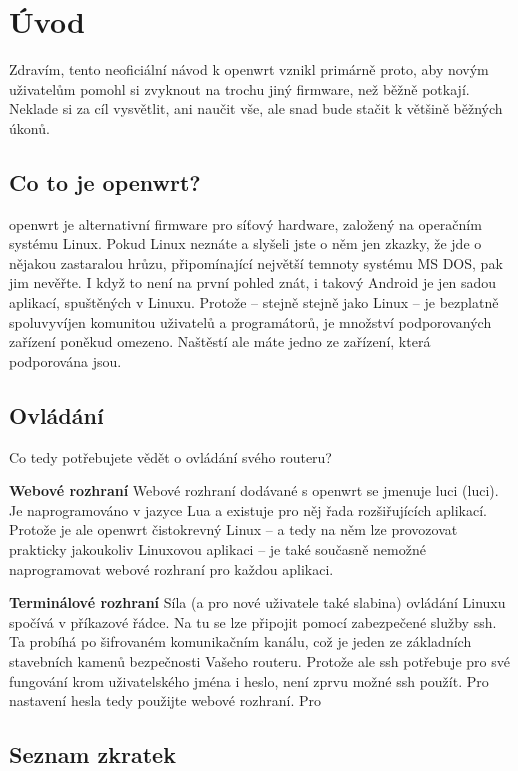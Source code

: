 \section{Úvod}
Zdravím, tento neoficiální návod k \gls{openwrt} vznikl primárně proto,
aby novým uživatelům pomohl si zvyknout na trochu jiný firmware, než běžně
potkají. Neklade si za cíl vysvětlit, ani naučit vše, ale snad bude
stačit k většině běžných úkonů.

\subsection{Co to je \gls{openwrt}?}
\gls{openwrt} je alternativní firmware pro síťový hardware, založený na
operačním systému Linux. Pokud Linux neznáte a slyšeli jste o něm jen
zkazky, že jde o nějakou zastaralou hrůzu, připomínající největší temnoty
systému MS DOS, pak jim nevěřte. I když to není na první pohled znát, i
takový Android je jen sadou aplikací, spuštěných v Linuxu. Protože -- stejně
stejně jako Linux -- je bezplatně spoluvyvíjen komunitou uživatelů a programátorů,
je množství podporovaných zařízení poněkud omezeno. Naštěstí ale máte jedno
ze zařízení, která podporována jsou.

\subsection{Ovládání}
Co tedy potřebujete vědět o ovládání svého routeru?
\begin{description}
\item{\textbf{Webové rozhraní}}
Webové rozhraní dodávané s \gls{openwrt} se jmenuje \acrshort{luci}
(\acrlong{luci}). Je naprogramováno v jazyce Lua a existuje pro něj řada
rozšiřujících aplikací. Protože je ale \gls{openwrt} čistokrevný Linux
-- a tedy na něm lze provozovat prakticky jakoukoliv Linuxovou aplikaci --
je také současně nemožné naprogramovat webové rozhraní pro každou aplikaci.
\item{\textbf{Terminálové rozhraní}}
Síla (a pro nové uživatele také slabina) ovládání Linuxu spočívá v příkazové
řádce. Na tu se lze připojit pomocí zabezpečené služby \gls{ssh}. Ta probíhá
po šifrovaném komunikačním kanálu, což je jeden ze základních stavebních
kamenů bezpečnosti Vašeho routeru. Protože ale ssh potřebuje pro své fungování
krom uživatelského jména i heslo, není zprvu možné ssh použít. Pro nastavení
hesla tedy použijte webové rozhraní. Pro
\end{description}

\subsection{Seznam zkratek}
\printglossaries
